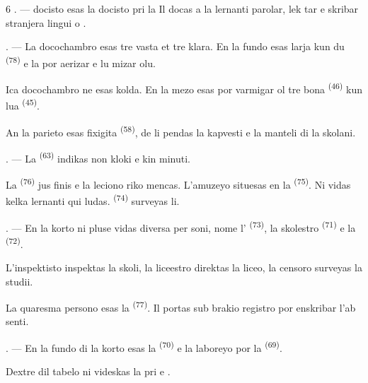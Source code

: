\begin{VUpage}[8]{6}
. ---  docisto esas la docisto pri la \cc
{} Il docas a la lernanti parolar, lek\cc
tar e skribar stranjera lingui \cc
{} o .

. --- La docochambro esas tre vasta et tre\nl
klara. En la fundo esas larja  kun du\nl
{} \textsuperscript{(78)} e la  por aerizar e lu\cc
mizar olu.

\VUblancAlinea
Ica docochambro ne esas kolda. En la mezo\nl
esas por varmigar ol tre bona  \textsuperscript{(46)} kun\nl
lua  \textsuperscript{(45)}.

\VUblancAlinea
An la parieto esas fixigita  \textsuperscript{(58)}, de\nl
li pendas la kapvesti e la manteli di la skolani.

\VUsaut{5.2mm}
\VUsaut{3.6mm}

. --- La  \textsuperscript{(63)} indikas non kloki e kin\nl
minuti.

\VUblancAlinea
La  \textsuperscript{(76)} jus finis e la leciono riko\cc
mencas. L'amuzeyo situesas en la  \textsuperscript{(75)}. Ni\nl
vidas kelka lernanti qui ludas.  \textsuperscript{(74)}\nl
surveyas li.

. --- En la korto ni pluse vidas diversa per\cc
soni, nome l' \textsuperscript{(73)}, la skolestro \cc
{} \textsuperscript{(71)} e la  \textsuperscript{(72)}.

\VUblancAlinea
L'inspektisto inspektas la skoli, la liceestro\nl
direktas la liceo, la censoro surveyas la studii.

\VUblancAlinea
La quaresma persono esas la  \textsuperscript{(77)}. Il\nl
portas sub brakio registro por enskribar l'ab\cc
senti.

. --- En la fundo di la korto esas la \cc
{} \textsuperscript{(70)} e la laboreyo por la \cc
{} \textsuperscript{(69)}.

\VUblancAlinea
Dextre dil tabelo ni videskas la \cc
{} pri  e .
\end{VUpage}


